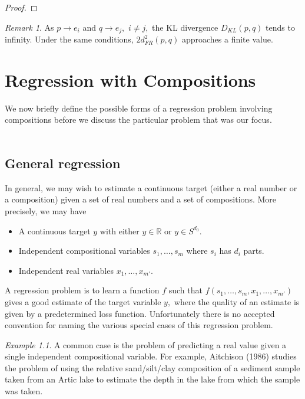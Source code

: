 \documentclass[BSc]{usydthesis}
\numberwithin{equation}{chapter}
\theoremstyle{remark}
\newtheorem{Remark}[equation]{Remark}
\newtheorem{Example}[equation]{Example}
\begin{document}
\begin{proof}
\end{proof}

\begin{Remark}
As $p\to e_i$ and $q\to e_j,$ $i\neq j,$ the KL divergence $D_{KL}(p,q)$ tends to infinity. Under the same conditions, $2 d_{FR}^2(p,q)$ approaches a finite value.  
\end{Remark}




\chapter{Regression with Compositions}

We now briefly define the possible forms of a regression problem involving compositions before we discuss the particular problem that was our focus. \\
\\

\section{General regression}
In general, we may wish to estimate a continuous target (either a real number or a composition) given a set of real numbers and a set of compositions. More precisely, we may have 

\begin{itemize}
 \item A continuous target $y$ with either $y\in \mathbb{R}$ or $y\in S^{d_0}.$
 \item Independent compositional variables $s_1,\ldots, s_m$ where $s_i$ has $d_i$ parts.
 \item Independent real variables $x_1, \ldots, x_{m'}$.
\end{itemize}
 
A regression problem is to learn a function $f$ such that $f(s_1,\ldots, s_m, x_1, \ldots, x_{m'})$ gives a good estimate of the target variable $y,$ where the quality of an estimate is given by a predetermined loss function. Unfortunately there is no accepted convention for naming the various special cases of this regression problem.

\begin{Example}
 A common case is the problem of predicting a real value given a single independent compositional variable. For example, Aitchison (1986) studies the problem of using the relative sand/silt/clay composition of a sediment sample taken from an Artic lake to estimate the depth in the lake from which the sample was taken. 
\end{Example}
\end{document}
